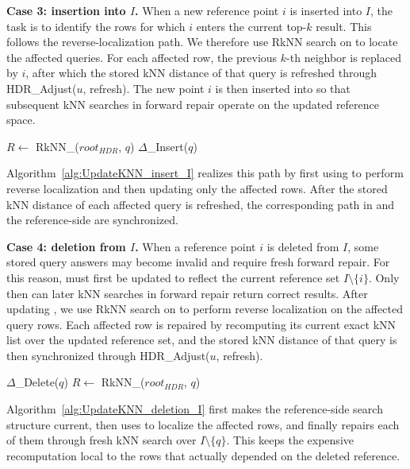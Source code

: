 \noindent \textbf{Case 3: insertion into $I$.}
When a new reference point $i$ is inserted into $I$, the task is to identify the rows for which $i$ enters the current top-$k$ result. This follows the reverse-localization path. We therefore use RkNN search on \hdrtree to locate the affected queries. For each affected row, the previous $k$-th neighbor is replaced by $i$, after which the stored kNN distance of that query is refreshed through HDR\_Adjust($u$, refresh). The new point $i$ is then inserted into \deltatree so that subsequent kNN searches in forward repair operate on the updated reference space.


\begin{algorithm}[t]
\caption{$\knnjoin$\_Insertion\_I($q$)}
\label{alg:UpdateKNN_insert_I}
$R\leftarrow$ RkNN\_\dualtree($root_{HDR}$, $q$)\;
$\Delta$\_Insert($q$)\;
\end{algorithm}

Algorithm~\ref{alg:UpdateKNN_insert_I} realizes this path by first using \hdrtree to perform reverse localization and then updating only the affected rows. After the stored kNN distance of each affected query is refreshed, the corresponding path in \hdrtree and the reference-side \deltatree are synchronized.

\noindent \textbf{Case 4: deletion from $I$.}
When a reference point $i$ is deleted from $I$, some stored query answers may become invalid and require fresh forward repair. For this reason, \deltatree must first be updated to reflect the current reference set $I\setminus\{i\}$. Only then can later kNN searches in forward repair return correct results. After updating \deltatree, we use RkNN search on \hdrtree to perform reverse localization on the affected query rows. Each affected row is repaired by recomputing its current exact kNN list over the updated reference set, and the stored kNN distance of that query is then synchronized through HDR\_Adjust($u$, refresh).

\begin{algorithm}[t]
\caption{$\knnjoin$\_Deletion\_I($q$)}
\label{alg:UpdateKNN_deletion_I}
$\Delta$\_Delete($q$)\;
$R\leftarrow$ RkNN\_\dualtree($root_{HDR}$, $q$)\;
\end{algorithm}

Algorithm~\ref{alg:UpdateKNN_deletion_I} first makes the reference-side search structure current, then uses \hdrtree to localize the affected rows, and finally repairs each of them through fresh kNN search over $I\setminus\{q\}$. This keeps the expensive recomputation local to the rows that actually depended on the deleted reference.
